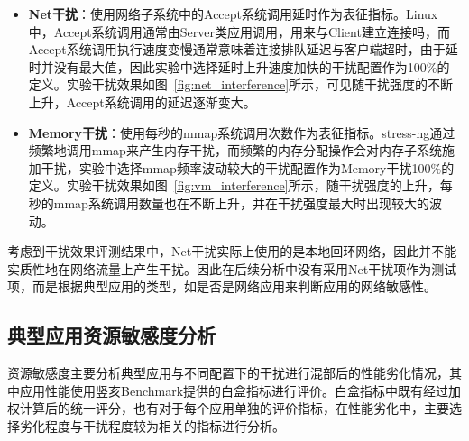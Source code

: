 \begin{itemize}
    \item \textbf{Net干扰}：使用网络子系统中的Accept系统调用延时作为表征指标。Linux中，Accept系统调用通常由Server类应用调用，用来与Client建立连接吗，而Accept系统调用执行速度变慢通常意味着连接排队延迟与客户端超时，由于延时并没有最大值，因此实验中选择延时上升速度加快的干扰配置作为100\%的定义。实验干扰效果如图~\ref{fig:net_interference}所示，可见随干扰强度的不断上升，Accept系统调用的延迟逐渐变大。
    
    \item \textbf{Memory干扰}：使用每秒的mmap系统调用次数作为表征指标。stress-ng通过频繁地调用mmap来产生内存干扰，而频繁的内存分配操作会对内存子系统施加干扰，实验中选择mmap频率波动较大的干扰配置作为Memory干扰100\%的定义。实验干扰效果如图~\ref{fig:vm_interference}所示，随干扰强度的上升，每秒的mmap系统调用数量也在不断上升，并在干扰强度最大时出现较大的波动。
\end{itemize}

考虑到干扰效果评测结果中，Net干扰实际上使用的是本地回环网络，因此并不能实质性地在网络流量上产生干扰。因此在后续分析中没有采用Net干扰项作为测试项，而是根据典型应用的类型，如是否是网络应用来判断应用的网络敏感性。

\subsection{典型应用资源敏感度分析}

资源敏感度主要分析典型应用与不同配置下的干扰进行混部后的性能劣化情况，其中应用性能使用竖亥Benchmark提供的白盒指标进行评价。白盒指标中既有经过加权计算后的统一评分，也有对于每个应用单独的评价指标，在性能劣化中，主要选择劣化程度与干扰程度较为相关的指标进行分析。

